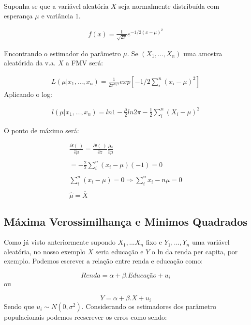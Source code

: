 \documentclass[
  letterpaper,
  DIV=11,
  numbers=noendperiod]{scrartcl}
\begin{document}
\begin{exemplo}

Suponha-se que a variável aleatória \(X\) seja normalmente distribuída
com esperança \(\mu\) e variância \(1\).

\[\begin{array}{ccc}
f(x)=\frac{1}{\sqrt{2 \pi}} e^{-1/2 (x-\mu)^2}
\end{array}\]

Encontrando o estimador do parâmetro \(\mu\). Se \((X_1,...,X_n)\) uma
amostra aleatórida da v.a. \(X\) a FMV será:

\[\begin{array}{ccc}
L(\mu|x_1,...,x_n)= \frac{1}{2 \pi ^{n/2}} exp[-1/2 \sum_i^n (x_i - \mu)^2 ]
\end{array}\] Aplicando o log:

\[\begin{array}{ccc}
l(\mu|x_1,...,x_n)= ln 1 - \frac{\mu}{2} ln 2 \pi - \frac{1}{2} \sum_i^n (X_i - \mu)^2 
\end{array}\]

O ponto de máximo será:

\[\begin{array}{ccc}
\frac{\partial l(.)}{\partial \mu} = \frac{\partial l(.)}{\partial z}\frac{\partial z}{\partial \mu}
\\
\\
= - \frac{2}{2}\sum_i^n (x_i - \mu)(-1) =0
\\
\\
\sum_i^n (x_i - \mu)=0 \Rightarrow \sum_i^n x_i - n\mu=0
\\
\\
\hat{\mu}=\overline{X}
\end{array}\]

\end{exemplo}

\subsection{Máxima Verossimilhança e Minimos
Quadrados}\label{muxe1xima-verossimilhanuxe7a-e-minimos-quadrados}

Como já visto anteriormente supondo \(X_1, ...X_n\) fixo e
\(Y_1,..., Y_n\) uma variável aleatória, no nosso exemplo \(X\) seria
educação e \(Y\) o ln da renda per capita, por exemplo. Podemos escrever
a relação entre renda e educação como:

\[Renda=\alpha+\beta . Educação + u_i\] ou

\[Y=\alpha+\beta . X + u_i\] Sendo que \(u_i \sim N(0,\sigma^2)\).
Considerando os estimadores dos parâmetro populacionais podemos
reescrever os erros como sendo:
\end{document}
